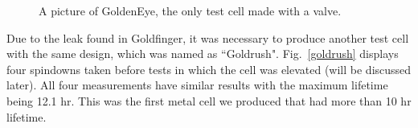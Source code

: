 \begin{figure}[t!]
	\centering
	\caption{{A picture of GoldenEye, the only test cell made with a valve.}}
	\label{goldeneye}
\end{figure}

Due to the leak found in Goldfinger, it was necessary to produce another test cell with the same design, which was named as ``Goldrush". Fig.~\ref{goldrush} displays four spindowns taken before tests in which the cell was elevated (will be discussed later). All four measurements have similar results with the maximum lifetime being 12.1 hr. This was the first metal cell we produced that had more than 10 hr lifetime. 

